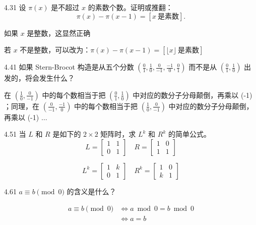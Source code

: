 \begin{problem}{4.3}{1}
  设 \( \pi(x) \) 是不超过 \( x \) 的素数个数。证明或推翻：
  \[
    \pi(x) - \pi(x-1) = [x \ \text{是素数}].
  \]
\end{problem}

如果 \( x \) 是整数，这显然正确

若 \( x \) 不是整数，可以改为：\( \pi(x) - \pi(x-1) = [\lfloor x \rfloor \ \text{是素数}] \)

\begin{problem}{4.4}{1}
  如果 Stern-Brocot 构造是从五个分数 \( (\frac{0}{1} , \frac{1}{0} , \frac{0}{-1} , \frac{-1}{0} , \frac{0}{1}) \) 而不是从 \( (\frac{0}{1} , \frac{1}{0}) \) 出发的，将会发生什么？
\end{problem}

在 \( (\frac{1}{0} , \frac{0}{-1}) \) 中的每个数相当于把 \( (\frac{0}{1} , \frac{1}{0}) \) 中对应的数分子分母颠倒，再乘以 (-1) ；同理，在 \( (\frac{0}{-1}, \frac{-1}{0}) \) 中的每个数相当于把 \( (\frac{1}{0} , \frac{0}{-1}) \) 中对应的数分子分母颠倒，再乘以 (-1) \( \dots \)

\begin{problem}{4.5}{1}
  当 \( L \) 和 \( R \) 是如下的 \( 2 \times 2 \) 矩阵时，求 \( L^k \) 和 \( R^k \) 的简单公式。
  \[
    L =
    \begin{bmatrix}
      1 & 1 \\
      0 & 1
    \end{bmatrix} \quad
    R =
    \begin{bmatrix}
      1 & 0 \\
      1 & 1
    \end{bmatrix}
  \]
\end{problem}

\[
  L^k =
  \begin{bmatrix}
    1 & k \\
    0 & 1
  \end{bmatrix} \quad
  R^k =
  \begin{bmatrix}
    1 & 0 \\
    k & 1
  \end{bmatrix}
\]

\begin{problem}{4.6}{1}
  \( a \equiv b \pmod{0} \) 的含义是什么？
\end{problem}

\begin{align*}
  a \equiv b \pmod{0} &\Leftrightarrow a \bmod 0 = b \bmod 0 \\
  &\Leftrightarrow a = b
\end{align*}

